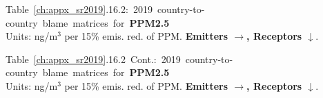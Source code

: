 
\footnotesize{\mbox{Table \ref{ch:appx_sr2019}.16.2: 2019 country-to-country blame matrices for \textbf{PPM2.5}}\\ Units: ng/m$^3$ per 15\% emis. red. of PPM. \textbf{Emitters $\rightarrow$, Receptors $\downarrow$}. }\\[\baselineskip]\enlargethispage{\myenlarge} \hspace{-0.5cm} 
\centerline{}\clearpage
\footnotesize{\mbox{Table \ref{ch:appx_sr2019}.16.2 Cont.: 2019 country-to-country blame matrices for \textbf{PPM2.5}}\\ Units: ng/m$^3$ per 15\% emis. red. of PPM. \textbf{Emitters $\rightarrow$, Receptors $\downarrow$}. }\\[\baselineskip]\enlargethispage{\myenlarge} \hspace{-0.5cm} 
\centerline{}\clearpage

